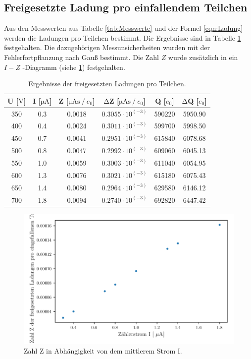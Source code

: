 \subsection{Freigesetzte Ladung pro einfallendem Teilchen}
\label{subsec:LadungProTeilchen}
Aus den Messwerten aus Tabelle \ref{tab:Messwerte} und der Formel \ref{eqn:Ladung} werden die Ladungen pro Teilchen bestimmt.
Die Ergebnisse sind in Tabelle \ref{tab:Ladungen} festgehalten.
Die dazugehörigen Messunsicherheiten wurden mit der Fehlerfortpflanzung nach Gauß bestimmt.
Die Zahl $Z$ wurde zusätzlich in ein $I-Z$ -Diagramm (siehe \ref{fig:I_Z}) festgehalten.

\begin{table}
  \label{tab:Ladungen}
  \centering
  \caption{Ergebnisse der freigesetzten Ladungen pro Teilchen.}
  \begin{tabular}{c c c c c c}
    \toprule
    {U [$\si{\volt}$]} & {I [$\si{\micro\ampere}$]} & {Z [$\si{\micro\ampere\second} \mathbin{/} e_0 $]} & {$\increment$Z [$\si{\micro\ampere\second} \mathbin{/} e_0 $]} & {Q [$e_0$]} & {$\increment$Q [$e_0$]}\\
    \midrule
    350 &0.3 & 0.0018 & $0.3055 \cdot 10^(-3)$ & 590220& 5950.90 \\
    400 &0.4 & 0.0024 & $0.3011 \cdot 10^(-3)$ & 599700& 5998.50 \\
    450 &0.7 & 0.0041 & $0.2951 \cdot 10^(-3)$ & 615840& 6078.68 \\
    500 &0.8 & 0.0047 & $0.2992 \cdot 10^(-3)$ & 609060& 6045.13 \\
    550 &1.0 & 0.0059 & $0.3003 \cdot 10^(-3)$ & 611040& 6054.95 \\
    600 &1.3 & 0.0076 & $0.3021 \cdot 10^(-3)$ & 615180& 6075.43 \\
    650 &1.4 & 0.0080 & $0.2964 \cdot 10^(-3)$ & 629580& 6146.12 \\
    700 &1.8 & 0.0094 & $0.2740 \cdot 10^(-3)$ & 692820& 6447.42 \\
  \end{tabular}
\end{table}

\begin{figure}
  \label{fig:I_Z}
  \centering
  \includegraphics[width=\textwidth]{Aufgabe_Bestimmung_des_Zaehlrohrstroms.pdf}
  \caption{Zahl Z in Abhängigkeit von dem mittlerem Strom I.}
\end{figure}

